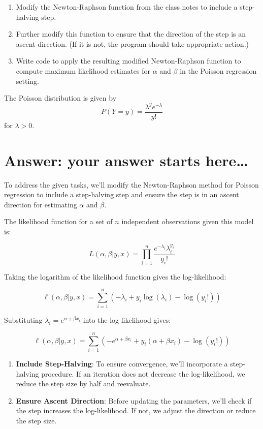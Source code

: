 \documentclass[
]{article}
\begin{document}
\begin{enumerate}
\item Modify the Newton-Raphson function from the class notes to include
a step-halving step.
\item Further modify this function to ensure that the direction of the
step is an ascent direction.   (If it is not, the program should take appropriate
action.)
\item Write code to apply the resulting modified Newton-Raphson function
to compute maximum likelihood estimates for $\alpha$ and $\beta$
in the Poisson regression setting.
\end{enumerate}

\vskip 5mm

\noindent The Poisson distribution is given by
\[P(Y=y) = \frac{\lambda^y e^{-\lambda}}{y!}\] for \(\lambda > 0\).

\hypertarget{answer-your-answer-starts-here-2}{%
\section{Answer: your answer starts
here\ldots{}}\label{answer-your-answer-starts-here-2}}

To address the given tasks, we'll modify the Newton-Raphson method for
Poisson regression to include a step-halving step and ensure the step is
in an ascent direction for estimating \(\alpha\) and \(\beta\).

The likelihood function for a set of \(n\) independent observations
given this model is:

\[ L(\alpha, \beta | y, x) = \prod_{i=1}^{n} \frac{e^{-\lambda_i} \lambda_i^{y_i}}{y_i!} \]

Taking the logarithm of the likelihood function gives the
log-likelihood:

\[ \ell(\alpha, \beta | y, x) = \sum_{i=1}^{n} \left( -\lambda_i + y_i \log(\lambda_i) - \log(y_i!) \right) \]

Substituting \(\lambda_i = e^{\alpha + \beta x_i}\) into the
log-likelihood gives:

\[ \ell(\alpha, \beta | y, x) = \sum_{i=1}^{n} \left( -e^{\alpha + \beta x_i} + y_i (\alpha + \beta x_i) - \log(y_i!) \right) \]

\begin{enumerate}
\def\labelenumi{\arabic{enumi}.}
\item
  \textbf{Include Step-Halving}: To ensure convergence, we'll
  incorporate a step-halving procedure. If an iteration does not
  decrease the log-likelihood, we reduce the step size by half and
  reevaluate.
\item
  \textbf{Ensure Ascent Direction}: Before updating the parameters,
  we'll check if the step increases the log-likelihood. If not, we
  adjust the direction or reduce the step size.
\end{enumerate}
\end{document}
